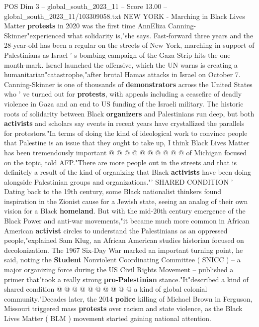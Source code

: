 \begin{textsample}{POS Dim 3 – global\_south\_2023\_11 – Score 13.00 – global\_south\_2023\_11/103309058.txt}  \label{ex:f3_pos_349}
NEW YORK - Marching in Black Lives Matter \textbf{protests} in 2020 was the first time AnnEliza Canning-Skinner"experienced what solidarity is,"she says.
Fast-forward three years and the 28-year-old has been a regular on the streets of New York, marching in support of Palestinians as Israel ' s bombing campaign of the Gaza Strip hits the one month-mark.
Israel launched the offensive, which the UN warns is creating a humanitarian"catastrophe,"after brutal Hamas attacks in Israel on October 7.
Canning-Skinner is one of thousands of \textbf{demonstrators} across the United States who ' ve turned out for \textbf{protests}, with appeals including a ceasefire of deadly violence in Gaza and an end to US funding of the Israeli military.
The historic roots of solidarity between Black \textbf{organizers} and Palestinians run deep, but both \textbf{activists} and scholars say events in recent years have crystallized the parallels for protestors."In terms of doing the kind of ideological work to convince people that Palestine is an issue that they ought to take up, I think Black Lives Matter has been tremendously important @ @ @ @ @ @ @ @ @ @ of Michigan focused on the topic, told AFP."There are more people out in the streets and that is definitely a result of the kind of organizing that Black \textbf{activists} have been doing alongside Palestinian groups and organizations."' SHARED CONDITION ' Dating back to the 19th century, some Black nationalist thinkers found inspiration in the Zionist cause for a Jewish state, seeing an analog of their own vision for a Black \textbf{homeland}.
But with the mid-20th century emergence of the Black Power and anti-war movements,"it became much more common in African American \textbf{activist} circles to understand the Palestinians as an oppressed people,"explained Sam Klug, an African American studies historian focused on decolonization.
The 1967 Six-Day War marked an important turning point, he said, noting the \textbf{Student} Nonviolent Coordinating Committee ( SNICC ) -- a major organizing force during the US Civil Rights Movement -- published a primer that"took a really strong \textbf{pro-Palestinian} stance."It"described a kind of shared condition @ @ @ @ @ @ @ @ @ @ a kind of global colonial community."Decades later, the 2014 \textbf{police} killing of Michael Brown in Ferguson, Missouri triggered mass \textbf{protests} over racism and state violence, as the Black Lives Matter ( BLM ) movement started gaining national attention.

\end{textsample}
